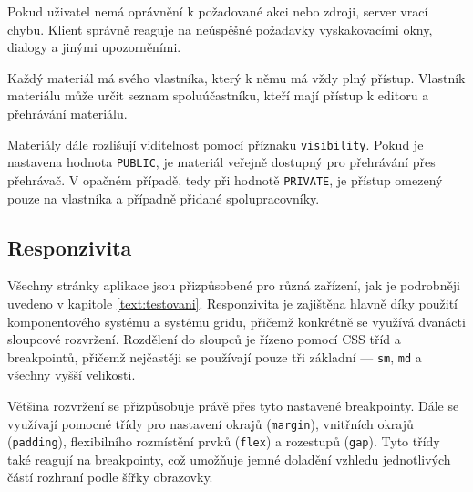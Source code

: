 Pokud uživatel nemá oprávnění k požadované akci nebo zdroji, server vrací chybu. 
Klient správně reaguje na neúspěšné požadavky vyskakovacími okny, dialogy a jinými upozorněními.

Každý materiál má svého vlastníka, který k němu má vždy plný přístup. 
Vlastník materiálu může určit seznam spoluúčastníku, kteří mají přístup k editoru a přehrávání materiálu.

Materiály dále rozlišují viditelnost pomocí příznaku \texttt{visibility}. 
Pokud je nastavena hodnota \texttt{PUBLIC}, je materiál veřejně dostupný pro přehrávání přes přehrávač. 
V opačném případě, tedy při hodnotě \texttt{PRIVATE}, je přístup omezený pouze na vlastníka a případně přidané spolupracovníky.





\subsection{Responzivita}


Všechny stránky aplikace jsou přizpůsobené pro různá zařízení, jak je podrobněji uvedeno v kapitole \ref{text:testovani}. 
Responzivita je zajištěna hlavně díky použití komponentového systému a systému gridu, přičemž konkrétně se využívá dvanácti sloupcové rozvržení. 
Rozdělení do sloupců je řízeno pomocí CSS tříd a breakpointů, přičemž nejčastěji se používají pouze tři základní — \texttt{sm}, \texttt{md} a všechny vyšší velikosti.

Většina rozvržení se přizpůsobuje právě přes tyto nastavené breakpointy. 
Dále se využívají pomocné třídy pro nastavení okrajů (\texttt{margin}), vnitřních okrajů (\texttt{padding}), flexibilního rozmístění prvků (\texttt{flex}) a rozestupů (\texttt{gap}). 
Tyto třídy také reagují na breakpointy, což umožňuje jemné doladění vzhledu jednotlivých částí rozhraní podle šířky obrazovky.

